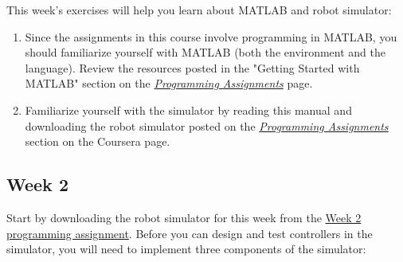 \documentclass[10pt]{article}
\begin{document}
This week's exercises will help you learn about MATLAB and robot simulator:

\begin{enumerate}
\item Since the assignments in this course involve programming in MATLAB, you should familiarize yourself with MATLAB (both the environment and the language). Review the resources posted in the "Getting Started with MATLAB" section on the \href{https://class.coursera.org/conrob-002/wiki/ProgrammingAssignments}{\textit{Programming Assignments}} page.

\item Familiarize yourself with the simulator by reading this manual and downloading the robot simulator posted on the \href{https://class.coursera.org/conrob-002/wiki/ProgrammingAssignments}{\textit{Programming Assignments}} section on the Coursera page.
\end{enumerate}

\newpage
\subsection{Week 2}
\label{sec:week-2}
Start by downloading the robot simulator for this week from the \href{https://class.coursera.org/conrob-002/assignment/view?assignment_id=5}{Week 2 programming assignment}. Before you can design and test controllers in the simulator, you will need to implement three components of the simulator:
\end{document}
